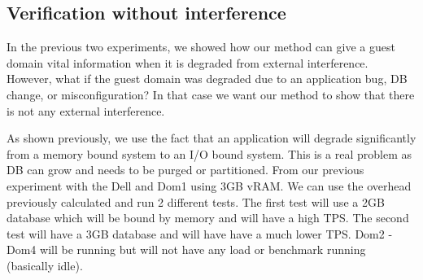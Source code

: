 \subsection{Verification without interference}
In the previous two experiments, we showed how our method can give a guest domain vital information when it is degraded from external interference.  However, what if the guest domain was degraded due to an application bug, DB change, or misconfiguration?   In that case we want our method to show that there is not any external interference.

\indent As shown previously, we use the fact that an application will degrade significantly from a memory bound system to an I/O bound system.  This is a real problem as DB can grow and needs to be purged or partitioned.  From our previous experiment with the Dell and Dom1 using 3GB vRAM.  We can use the overhead previously calculated and run 2 different tests.  The first test will use a 2GB database which will be bound by memory and will have a high TPS. The second test will have a 3GB database and will have have a much lower TPS.  Dom2 - Dom4 will be running but will not have any load or benchmark running (basically idle).








